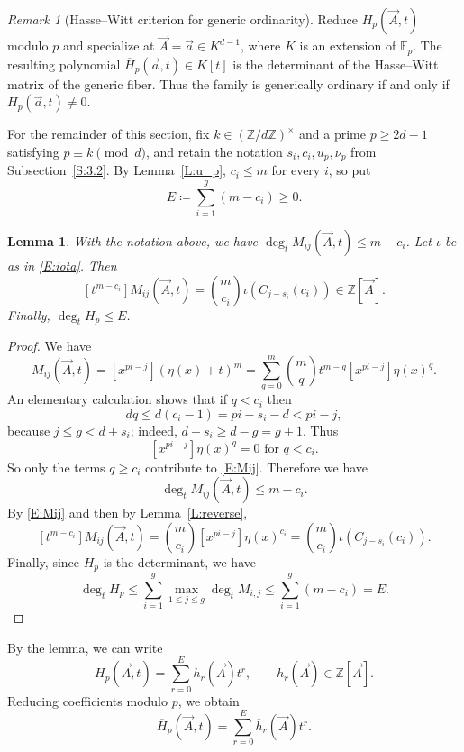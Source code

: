 \documentclass{amsart}
\theoremstyle{plain}
\newtheorem{lemma}[theorem]{Lemma}
\theoremstyle{remark}
\newtheorem{remark}[theorem]{Remark}
\renewcommand{\bar}{\overline}
\newcommand{\1}{\mathbf{1}}
\newcommand{\F}{\mathbb{F}}
\newcommand{\Z}{\mathbb{Z}}
\newcommand{\va}{{\vec{a}}}
\newcommand{\vA}{{\vec{A}}}
\begin{document}
\begin{remark}[Hasse--Witt criterion for generic ordinarity]
\label{R:Hasse--Witt}
Reduce $H_p(\vA,t)$ modulo $p$ and specialize
at $\vA=\va\in K^{d-1}$, where $K$ is an extension of $\F_p$. The
resulting polynomial
$\bar{H}_p(\va,t)\in K[t]$
is the determinant of the Hasse--Witt matrix of
the generic fiber.
Thus the family is generically ordinary if and only if
$\bar{H}_p(\va,t)\ne 0$.
\end{remark}

For the remainder of this section, fix $k\in (\Z/d\Z)^\times$
and a prime $p\ge 2d-1$ satisfying $p\equiv k\pmod d$, and
retain the notation $s_i,c_i,u_p,\nu_p$ from
Subsection~\ref{S:3.2}.
By Lemma~\ref{L:u_p}, $c_i\le m$ for every $i$, so put
$$E \coloneqq \sum_{i=1}^g \left(m-c_i\right) \ge 0.$$

\begin{lemma}\label{L:above}
With the notation above, we have
$\deg_t M_{ij}(\vA,t) \le m-c_i$.
Let $\iota$ be as in \eqref{E:iota}.
Then
\[
[t^{m-c_i}]M_{ij}(\vA,t)=\binom{m}{c_i}\iota(C_{j-s_i}(c_i))\in \Z[\vA].
\]
Finally, $\deg_t H_p\le E$.
\end{lemma}
\begin{proof}
We have
\begin{equation}\label{E:Mij}
M_{ij}(\vA,t)=
[x^{pi-j}](\eta(x)+t)^m=
\sum_{q=0}^{m}
\binom{m}{q}t^{m-q}[x^{pi-j}]\eta(x)^q.
\end{equation}
An elementary calculation shows that
if $q< c_i$ then
\[
dq\le d(c_i-1)=pi-s_i-d<pi-j,
\]
because $j\le g<d+s_i$; indeed, $d+s_i\ge d-g=g+1$.
Thus
\[
[x^{pi-j}]\eta(x)^q=0 \text{ for $q<c_i$}.
\]
So only the terms $q\ge c_i$ contribute to \eqref{E:Mij}.
Therefore we have
\[
\deg_t M_{ij}(\vA,t) \le m-c_i.
\]
By \eqref{E:Mij} and then by Lemma~\ref{L:reverse},
\[
[t^{m-c_i}]M_{ij}(\vA,t)=\binom{m}{c_i}[x^{pi-j}]\eta(x)^{c_i}
=\binom{m}{c_i}\iota\left(C_{j-s_i}(c_i)\right).
\]
Finally, since $H_p$ is the determinant, we have
\[
\deg_t H_p\le \sum_{i=1}^{g}\max_{1\le j\le g}\deg_t M_{i,j}
\le\sum_{i=1}^g (m-c_i)=E.
\]
\end{proof}

By the lemma, we can write
\begin{equation*}
H_p(\vA,t)=\sum_{r=0}^E h_r(\vA)t^r, \qquad h_r(\vA)\in\Z[\vA].
\end{equation*}
Reducing coefficients modulo $p$, we obtain
\begin{equation}\label{E:HH}
\bar{H}_p(\vA,t)=\sum_{r=0}^E \bar{h}_r(\vA)t^r.
\end{equation}
\end{document}
